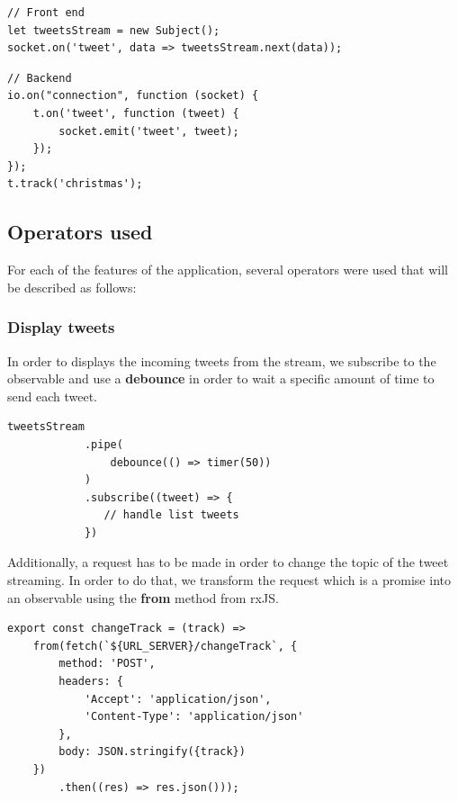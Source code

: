 \documentclass[12pt]{report}
\begin{document}
\begin{verbatim}
// Front end
let tweetsStream = new Subject();
socket.on('tweet', data => tweetsStream.next(data));
\end{verbatim}

\begin{verbatim}
// Backend
io.on("connection", function (socket) {
    t.on('tweet', function (tweet) {
        socket.emit('tweet', tweet);
    });
});
t.track('christmas');
\end{verbatim}
\subsection{Operators used}
For each of the features of the application, several operators were used that will be described as follows:

\subsubsection{Display tweets}
In order to displays the incoming tweets from the stream, we subscribe to the observable and use a \textbf{debounce} in order to wait a specific amount of time to send each tweet. 
\begin{verbatim}
tweetsStream
            .pipe(
                debounce(() => timer(50))
            )
            .subscribe((tweet) => {
               // handle list tweets
            })
\end{verbatim}
Additionally, a request has to be made in order to change the topic of the tweet streaming. In order to do that, we transform the request which is a promise into an observable using the \textbf{from} method from rxJS.
\begin{verbatim}
export const changeTrack = (track) =>
    from(fetch(`${URL_SERVER}/changeTrack`, {
        method: 'POST',
        headers: {
            'Accept': 'application/json',
            'Content-Type': 'application/json'
        },
        body: JSON.stringify({track})
    })
        .then((res) => res.json()));
\end{verbatim}
\end{document}
